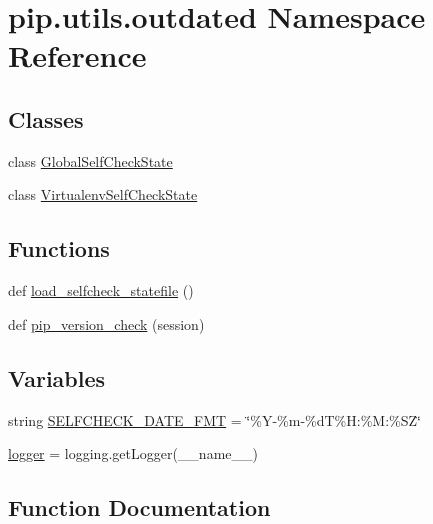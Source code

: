 \hypertarget{namespacepip_1_1utils_1_1outdated}{}\section{pip.\+utils.\+outdated Namespace Reference}
\label{namespacepip_1_1utils_1_1outdated}
\subsection*{Classes}
\begin{DoxyCompactItemize}
\item 
class \hyperlink{classpip_1_1utils_1_1outdated_1_1_global_self_check_state}{Global\+Self\+Check\+State}
\item 
class \hyperlink{classpip_1_1utils_1_1outdated_1_1_virtualenv_self_check_state}{Virtualenv\+Self\+Check\+State}
\end{DoxyCompactItemize}
\subsection*{Functions}
\begin{DoxyCompactItemize}
\item 
def \hyperlink{namespacepip_1_1utils_1_1outdated_a7d04cce928fd0c6ee51d31bbc9f2e676}{load\+\_\+selfcheck\+\_\+statefile} ()
\item 
def \hyperlink{namespacepip_1_1utils_1_1outdated_a40b845338f66acebadff26c747ae9c86}{pip\+\_\+version\+\_\+check} (session)
\end{DoxyCompactItemize}
\subsection*{Variables}
\begin{DoxyCompactItemize}
\item 
string \hyperlink{namespacepip_1_1utils_1_1outdated_a45149473062f1dfbdef827d26beb4ea1}{S\+E\+L\+F\+C\+H\+E\+C\+K\+\_\+\+D\+A\+T\+E\+\_\+\+F\+MT} = \char`\"{}\%Y-\/\%m-\/\%dT\%H\+:\%M\+:\%SZ\char`\"{}
\item 
\hyperlink{namespacepip_1_1utils_1_1outdated_a8d835a5e8bc910159ca9898e156c06c1}{logger} = logging.\+get\+Logger(\+\_\+\+\_\+name\+\_\+\+\_\+)
\end{DoxyCompactItemize}


\subsection{Function Documentation}
\mbox{\label{namespacepip_1_1utils_1_1outdated_a7d04cce928fd0c6ee51d31bbc9f2e676}} 
